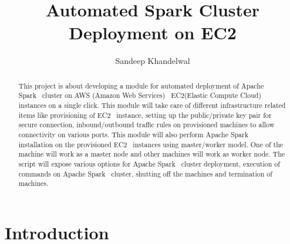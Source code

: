 
\title{Automated Spark Cluster Deployment on EC2}


\author{Sandeep Khandelwal}


\renewcommand{\shortauthors}{Sandeep}


\begin{abstract}

This project is about developing a module for automated deployment of
Apache Spark~\cite{hid-sp18-511-www-spark} cluster on AWS (Amazon Web
Services)~\cite{hid-sp18-511-www-aws} EC2(Elastic Compute
Cloud)~\cite{hid-sp18-511-www-ec2} instances on a single click. This
module will take care of different infrastructure related items like
provisioning of EC2~\cite{hid-sp18-511-www-ec2}
instance, setting up the public/private key pair for secure connection,
inbound/outbound traffic rules on provisioned machines to allow
connectivity on various ports. This module will also perform Apache
Spark~\cite{hid-sp18-511-www-spark} installation on the provisioned
EC2~\cite{hid-sp18-511-www-ec2} instances using
master/worker model. One of the machine will work as a master node and
other machines will work as worker node. The script will expose
various options for Apache Spark~\cite{hid-sp18-511-www-spark} cluster deployment, execution of commands on
Apache Spark~\cite{hid-sp18-511-www-spark} cluster, shutting off the machines and termination of machines.

\end{abstract}



\maketitle

\section{Introduction}

